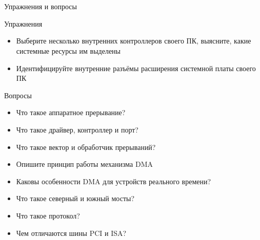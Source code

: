 \documentclass[xetex,aspectratio=43]{beamer}
\begin{document}
\section*{}

\begin{frame}{Упражнения и вопросы}
	\begin{block}{Упражнения}
		\begin{itemize}
			\tightlist
			\item
			Выберите несколько внутренних контроллеров своего ПК, выясните, какие
			системные ресурсы им выделены
            \item
            Идентифицируйте внутренние разъёмы расширения системной платы своего ПК
		\end{itemize}
	\end{block}

	\begin{block}{Вопросы}
		\begin{itemize}
			\tightlist
			\item
			Что такое аппаратное прерывание?
			\item
			Что такое драйвер, контроллер и порт?
			\item
			Что такое вектор и обработчик прерываний?
			\item
			Опишите принцип работы механизма DMA
			\item
			Каковы особенности DMA для устройств реального времени?
            \item
            Что такое северный и южный мосты?
            \item
            Что такое протокол?
            \item Чем отличаются шины PCI и ISA?
		\end{itemize}
	\end{block}
\end{frame}

\postamble
\end{document}

